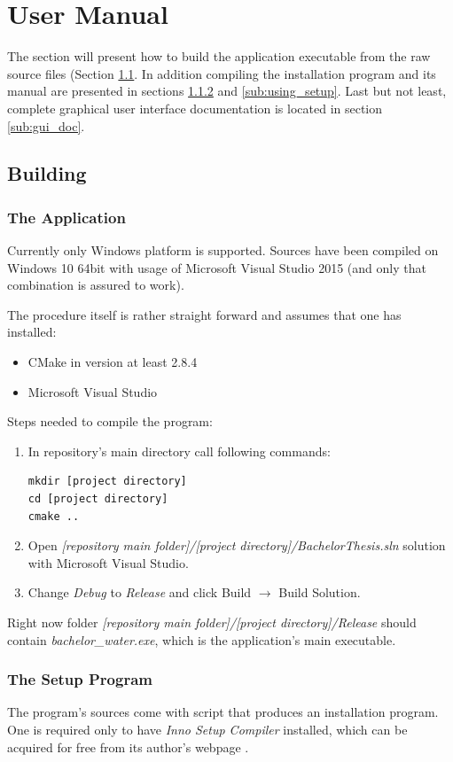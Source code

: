 \documentclass{report}
\begin{document}
\section{User Manual}
The section will present how to build the application executable from the raw source files (Section \ref{sub:building}. In addition compiling the installation program and its manual are presented in sections \ref{sub:building_setup} and \ref{sub:using_setup}. Last but not least, complete graphical user interface documentation is located in section \ref{sub:gui_doc}.
\subsection{Building} \label{sub:building}
\subsubsection{The Application} \label{subsub:build_app}
Currently only Windows platform is supported. Sources have been compiled on Windows 10 64bit with usage of Microsoft Visual Studio 2015 (and only that combination is assured to work). 

The procedure itself is rather straight forward and assumes that one has installed:
\begin{itemize}
\item CMake in version at least 2.8.4
\item Microsoft Visual Studio 
\end{itemize}

Steps needed to compile the program:
\begin{enumerate}
\item In repository's main directory call following commands:
 \begin{lstlisting}
mkdir [project directory]
cd [project directory]
cmake ..
 \end{lstlisting}
\item Open  \textit{[repository main folder]/[project directory]/BachelorThesis.sln} solution with Microsoft Visual Studio.
\item Change \textit{Debug} to \textit{Release} and click Build $\rightarrow$ Build Solution.
\end{enumerate}
Right now folder \textit{[repository main folder]/[project directory]/Release} should contain \textit{bachelor\_water.exe}, which is the application's main executable.
\subsubsection{The Setup Program} \label{sub:building_setup}
The program's sources come with script that produces an installation program. One is required only to have \textit{Inno Setup Compiler} installed, which can be acquired for free from its author's webpage \cite{inno_setup}. 
\end{document}
